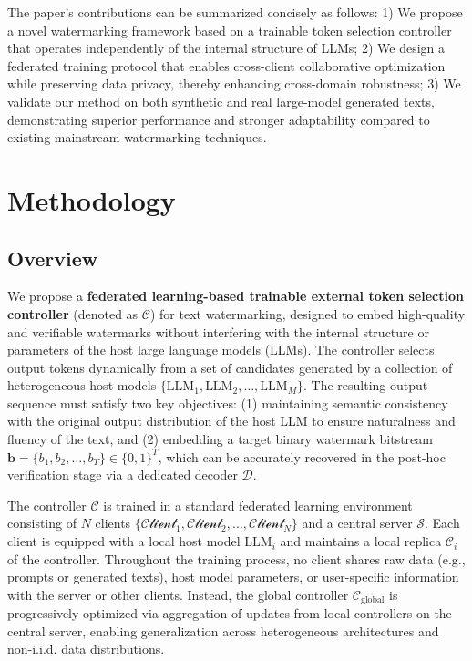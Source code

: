 \documentclass{article}
\begin{document}
The paper’s contributions can be summarized concisely as follows: 1) We propose a novel watermarking framework based on a trainable token selection controller that operates independently of the internal structure of LLMs; 2) We design a federated training protocol that enables cross-client collaborative optimization while preserving data privacy, thereby enhancing cross-domain robustness; 3) We validate our method on both synthetic and real large-model generated texts, demonstrating superior performance and stronger adaptability compared to existing mainstream watermarking techniques.


\section{Methodology}
\label{sec:method}
\subsection{Overview}
We propose a \textbf{federated learning-based trainable external token selection controller} (denoted as \( \mathcal{C} \)) for text watermarking, designed to embed high-quality and verifiable watermarks without interfering with the internal structure or parameters of the host large language models (LLMs). The controller selects output tokens dynamically from a set of candidates generated by a collection of heterogeneous host models \( \{\text{LLM}_1, \text{LLM}_2, \ldots, \text{LLM}_M\} \). The resulting output sequence must satisfy two key objectives: (1) maintaining semantic consistency with the original output distribution of the host LLM to ensure naturalness and fluency of the text, and (2) embedding a target binary watermark bitstream \( \mathbf{b} = \{b_1, b_2, \ldots, b_T\} \in \{0,1\}^T \), which can be accurately recovered in the post-hoc verification stage via a dedicated decoder \( \mathcal{D} \). 
 
 The controller \( \mathcal{C} \) is trained in a standard federated learning environment consisting of \( N \) clients \( \{\mathcal{Client}_1, \mathcal{Client}_2, \ldots, \mathcal{Client}_N\} \) and a central server \( \mathcal{S} \). Each client is equipped with a local host model \( \text{LLM}_i \) and maintains a local replica \( \mathcal{C}_i \) of the controller. Throughout the training process, no client shares raw data (e.g., prompts or generated texts), host model parameters, or user-specific information with the server or other clients. Instead, the global controller \( \mathcal{C}_{\text{global}} \) is progressively optimized via aggregation of updates from local controllers on the central server, enabling generalization across heterogeneous architectures and non-i.i.d. data distributions. 
 
\end{document}
